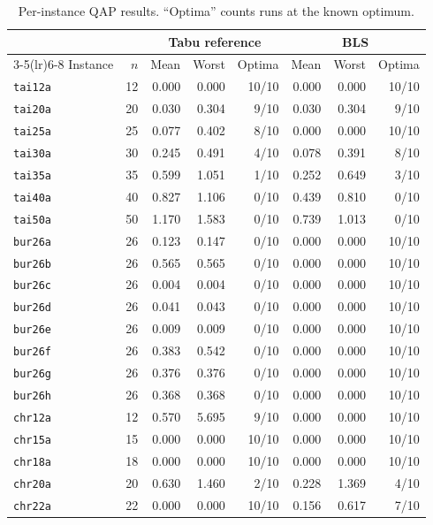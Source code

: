 \documentclass[10pt]{article}
\begin{document}
\begin{table}[H]
\centering
\caption{Per-instance QAP results. ``Optima'' counts runs at the known optimum.}
\small
\begin{tabular}{lrrrrrrr}
\toprule
 & & \multicolumn{3}{c}{Tabu reference} & \multicolumn{3}{c}{BLS} \\
\cmidrule(lr){3-5}\cmidrule(lr){6-8}
Instance & $n$ & Mean & Worst & Optima & Mean & Worst & Optima \\
\midrule
\texttt{tai12a} & 12 & 0.000 & 0.000 & 10/10 & 0.000 & 0.000 & 10/10 \\
\texttt{tai20a} & 20 & 0.030 & 0.304 & 9/10 & 0.030 & 0.304 & 9/10 \\
\texttt{tai25a} & 25 & 0.077 & 0.402 & 8/10 & 0.000 & 0.000 & 10/10 \\
\texttt{tai30a} & 30 & 0.245 & 0.491 & 4/10 & 0.078 & 0.391 & 8/10 \\
\texttt{tai35a} & 35 & 0.599 & 1.051 & 1/10 & 0.252 & 0.649 & 3/10 \\
\texttt{tai40a} & 40 & 0.827 & 1.106 & 0/10 & 0.439 & 0.810 & 0/10 \\
\texttt{tai50a} & 50 & 1.170 & 1.583 & 0/10 & 0.739 & 1.013 & 0/10 \\
\texttt{bur26a} & 26 & 0.123 & 0.147 & 0/10 & 0.000 & 0.000 & 10/10 \\
\texttt{bur26b} & 26 & 0.565 & 0.565 & 0/10 & 0.000 & 0.000 & 10/10 \\
\texttt{bur26c} & 26 & 0.004 & 0.004 & 0/10 & 0.000 & 0.000 & 10/10 \\
\texttt{bur26d} & 26 & 0.041 & 0.043 & 0/10 & 0.000 & 0.000 & 10/10 \\
\texttt{bur26e} & 26 & 0.009 & 0.009 & 0/10 & 0.000 & 0.000 & 10/10 \\
\texttt{bur26f} & 26 & 0.383 & 0.542 & 0/10 & 0.000 & 0.000 & 10/10 \\
\texttt{bur26g} & 26 & 0.376 & 0.376 & 0/10 & 0.000 & 0.000 & 10/10 \\
\texttt{bur26h} & 26 & 0.368 & 0.368 & 0/10 & 0.000 & 0.000 & 10/10 \\
\texttt{chr12a} & 12 & 0.570 & 5.695 & 9/10 & 0.000 & 0.000 & 10/10 \\
\texttt{chr15a} & 15 & 0.000 & 0.000 & 10/10 & 0.000 & 0.000 & 10/10 \\
\texttt{chr18a} & 18 & 0.000 & 0.000 & 10/10 & 0.000 & 0.000 & 10/10 \\
\texttt{chr20a} & 20 & 0.630 & 1.460 & 2/10 & 0.228 & 1.369 & 4/10 \\
\texttt{chr22a} & 22 & 0.000 & 0.000 & 10/10 & 0.156 & 0.617 & 7/10 \\
\bottomrule
\end{tabular}
\end{table}
\end{document}
